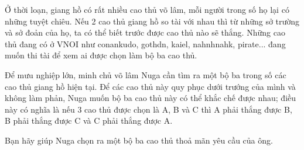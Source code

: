 Ở thời loạn, giang hồ có rất nhiều cao thủ võ lâm, mỗi người trong số họ lại có những tuyệt chiêu. Nếu 2 cao thủ giang hồ so tài với nhau thì từ những sở trường và sở đoản của họ, ta có thể biết trước được cao thủ nào sẽ thắng. Những cao thủ đang có ở VNOI như conankudo, gothdn, kaiel, nahnhnahk, pirate... đang muốn thi tài để xem ai được chọn làm bộ ba cao thủ.  

   Để mưu nghiệp lớn, minh chủ võ lâm Nuga cần tìm ra một bộ ba trong số các cao thủ giang hồ hiện tại. Để các cao thủ này quy phục dưới trướng của mình và không làm phản, Nuga muốn bộ ba cao thủ này có thể khắc chế được nhau; điều này có nghĩa là nếu 3 cao thủ được chọn là A, B và C thì A phải thắng được B, B phải thắng được C và C phải thắng được A.  

   Bạn hãy giúp Nuga chọn ra một bộ ba cao thủ thoả mãn yêu cầu của ông.  

\